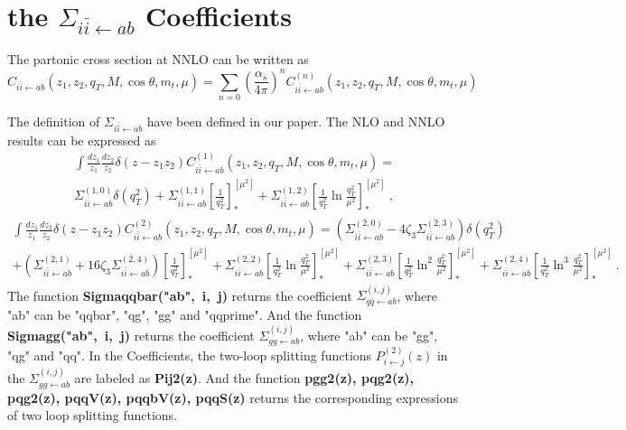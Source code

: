 \documentclass[letterpaper,aps,prd,,nofootinbib]{revtex4}
\begin{document}
\section{the $\Sigma_{i\bar{i}\leftarrow ab}$ Coefficients}

The partonic cross section at NNLO can be written as
\begin{equation}
  C_{i\bar{i}\leftarrow ab}(z_1,z_2,q_T,M,\cos\theta,m_t,\mu)=\sum_{n=0}
        \left(\frac{\alpha_s}{4\pi}\right)^n C^{(n)}_{i\bar{i}\leftarrow ab}(z_1,z_2,q_T,M,\cos\theta,m_t,\mu)
\end{equation}

The definition of $\Sigma_{i\bar{i}\leftarrow ab}$ have been defined in our paper. The NLO and NNLO results can be expressed as
 \begin{multline}
 \label{eq:nlo_qt}
          \int \frac{dz_1}{z_1} \frac{dz_2}{z_2} \delta(z-z_1 z_2)
          C^{(1)}_{i\bar{i}\leftarrow ab}(z_1,z_2,q_T,M,\cos\theta,m_t,\mu)=
          \\
          \Sigma^{(1,0)}_{i\bar{i}\leftarrow ab}
          \delta(q_T^2)
          +
          \Sigma^{(1,1)}_{i\bar{i}\leftarrow ab}
          \left[ \frac{1}{q_T^2}\right]_*^{[\mu^2]} +
          \Sigma^{(1,2)}_{i\bar{i}\leftarrow ab}
          \left[\frac{1}{q_T^2} \ln\frac{q_T^2}{\mu^2}\right]_*^{[\mu^2]}\ ,
 \end{multline}
 \begin{multline}
 \label{eq:nnlo_qt}
          \int \frac{dz_1}{z_1} \frac{dz_2}{z_2} \delta(z-z_1 z_2)
          C^{(2)}_{i\bar{i}\leftarrow ab}(z_1,z_2,q_T,M,\cos\theta,m_t,\mu) =
          (\Sigma^{(2,0)}_{i\bar{i}\leftarrow ab}-4 \zeta_3 \Sigma^{(2,3)}_{i\bar{i}\leftarrow ab})
          \delta(q_T^2)
         \\
          +
          (\Sigma^{(2,1)}_{i\bar{i}\leftarrow ab}+ 16 \zeta_3\Sigma^{(2,4)}_{i\bar{i}\leftarrow ab})
           \left[\frac{1}{q_T^2}\right]_*^{[\mu^2]} +
          \Sigma^{(2,2)}_{i\bar{i}\leftarrow ab}
           \left[ \frac{1}{q_T^2} \ln\frac{q_T^2}{\mu^2}\right]_*^{[\mu^2]}+
           \Sigma^{(2,3)}_{i\bar{i}\leftarrow ab}
           \left[\frac{1}{q_T^2} \ln^2\frac{q_T^2}{\mu^2}\right]_*^{[\mu^2]}+
            \Sigma^{(2,4)}_{i\bar{i}\leftarrow ab} \left[\frac{1}{q_T^2} \ln^3\frac{q_T^2}{\mu^2}\right]_*^{[\mu^2]}\ .
 \end{multline}
The function {\bf{Sigmaqqbar("ab",\ i,\ j)}} returns the coefficient $\Sigma_{q\bar{q}\leftarrow ab}^{(i,j)}$, where "ab" can be "qqbar", "qg", "gg" and "qqprime". And the function {\bf{Sigmagg("ab",\ i,\ j)}} returns the coefficient $\Sigma_{gg\leftarrow ab}^{(i,j)}$, where "ab" can be  "gg", "qg" and "qq".
In the Coefficients,  the two-loop splitting functions $P^{(2)}_{i\leftarrow j}(z)$ in the $\Sigma_{gg\leftarrow ab}^{(i,j)}$ are labeled as {\bf{Pij2(z)}}. And the function {\bf {pgg2(z), pqg2(z), pqg2(z), pqqV(z), pqqbV(z), pqqS(z)}} returns the corresponding expressions of two loop splitting  functions.
\end{document}
